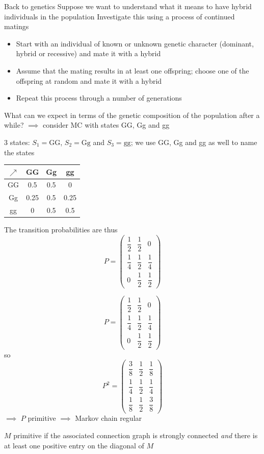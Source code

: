 \documentclass[aspectratio=169]{beamer}
\begin{document}
\begin{frame}{Back to genetics}
Suppose we want to understand what it means to have hybrid individuals in the population
\vfill
Investigate this using a process of continued matings
\begin{itemize}
\item Start with an individual of known or unknown
genetic character (dominant, hybrid or recessive) and mate it with a hybrid
\item Assume that the mating results in at least one
offspring; choose one of the offspring at random and mate it with a hybrid
\item Repeat this process through a number of generations
\end{itemize}
\vfill
What can we expect in terms of the genetic composition of the population after a while? 
\vfill
$\implies$ consider MC with states GG, Gg and gg
\end{frame}


\begin{frame}
3 states: $S_1=\textrm{GG}$, $S_2=\textrm{Gg}$ and $S_3=\textrm{gg}$; we use GG, Gg and gg as well to name the states
\vfill
\begin{center}
\begin{tabular}{c|ccc}
$\nearrow$ & GG & Gg & gg \\
\hline
GG & 0.5 & 0.5 & 0 \\
Gg & 0.25 & 0.5 & 0.25 \\
gg & 0 & 0.5 & 0.5
\end{tabular}
\end{center}
\vfill
The transition probabilities are thus
\[
P=\begin{pmatrix}
\dfrac 12 & \dfrac 12 & 0 \\[10pt]
\dfrac 14 & \dfrac 12 & \dfrac 14 \\[10pt]
0 & \dfrac 12 & \dfrac 12
\end{pmatrix}
\]
\end{frame}

\begin{frame}
\[
P=\begin{pmatrix}
\dfrac 12 & \dfrac 12 & 0 \\[10pt]
\dfrac 14 & \dfrac 12 & \dfrac 14 \\[10pt]
0 & \dfrac 12 & \dfrac 12
\end{pmatrix}
\]
so
\[
P^2=\begin{pmatrix}
\dfrac 38 & \dfrac 12 & \dfrac 18 \\[10pt]
\dfrac 14 & \dfrac 12 & \dfrac 14 \\[10pt]
\dfrac 18 & \dfrac 12 & \dfrac 38
\end{pmatrix}
\]
\vfill
$\implies$ $P$ primitive $\implies$ Markov chain regular
\vfill
\begin{theorem}
$M$ primitive if the associated connection graph is strongly connected \emph{and} there is at least one positive entry on the diagonal of $M$
\end{theorem}
\end{frame}
\end{document}
